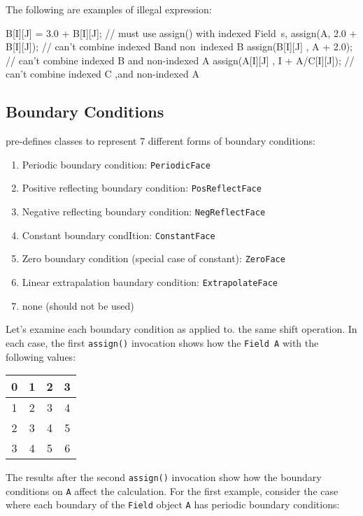 The following are examples of illegal expression:
\begin{smallcode}
B[I][J] = 3.0 + B[I][J]; 	// must use assign() with indexed Field~s, 
assign(A, 2.0 + B[I][J]); // can't combine indexed Band non~indexed B 
assign(B[I][J] , A + 2.0); 	// can't combine indexed B and non-indexed A 
assign(A[I][J] , I + A/C[I][J]); // can't combine indexed C ,and non-indexed A 
\end{smallcode}

\subsection{Boundary Conditions}
\ippl pre-defines classes to represent 7 different forms of boundary conditions: 
\begin{enumerate}
\item Periodic boundary condition: \texttt{PeriodicFace}
\item Positive reflecting boundary condition: \texttt{PosReflectFace} 
\item Negative reflecting boundary condition: \texttt{NegReflectFace} 
\item Constant boundary condItion: \texttt{ConstantFace} 
\item Zero boundary condition (special case of constant): \texttt{ZeroFace} 
\item Linear extrapalation baundary condition: \texttt{ExtrapolateFace}
\item none (should not be used) 
\end{enumerate}
Let's examine each boundary condition as applied to. the same shift operation. In each case, the first \texttt{assign()} invocation shows how the \texttt{Field A} with the following values: 
\begin{center}
        \begin{tabular}{|c|c|c|c|}
        \hline
        0 & 1 & 2 & 3 \\        \hline
        1 & 2 & 3 & 4 \\        \hline
        2 & 3 & 4 & 5 \\        \hline
        3 & 4 & 5 & 6 \\        \hline	
        \end{tabular}
   \label{tbl:t1}
   \end{center}
The results after the second \texttt{assign()} invocation show how the boundary conditions on \texttt{A} affect the calculation. 
For the first example, consider the case where each boundary of the \texttt{Field} object \texttt{A} has periodic boundary conditions: 

